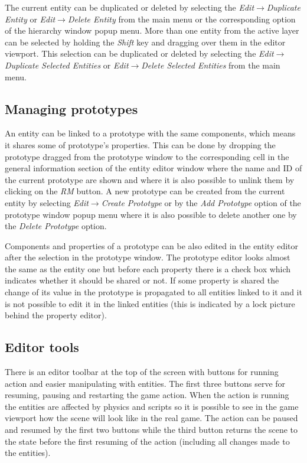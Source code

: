The current entity can be duplicated or deleted by selecting the \emph{Edit}$\rightarrow$\emph{Du\-pli\-ca\-te Entity} or \emph{Edit}$\rightarrow$\emph{Delete Entity} from the main menu or the corresponding option of the hierarchy window popup menu. More than one entity from the active layer can be selected by holding the \emph{Shift} key and dragging over them in the editor viewport. This selection can be duplicated or deleted by selecting the \emph{Edit}$\rightarrow$\emph{Duplicate Selected Entities} or \emph{Edit}$\rightarrow$\emph{Delete Selected Entities} from the main menu.

\subsection{Managing prototypes}
\label{sub:editor-prototypes}

An entity can be linked to a prototype with the same components, which means it shares some of prototype's properties. This can be done by dropping the prototype dragged from the prototype window to the corresponding cell in the general information section of the entity editor window where the name and ID of the current prototype are shown and where it is also possible to unlink them by clicking on the \emph{RM} button. A new prototype can be created from the current entity by selecting \emph{Edit}$\rightarrow$\emph{Create Prototype} or by the \emph{Add Prototype} option of the prototype window popup menu where it is also possible to delete another one by the \emph{Delete Prototype} option.

Components and properties of a prototype can be also edited in the entity editor after the selection in the prototype window. The prototype editor looks almost the same as the entity one but before each property there is a check box which indicates whether it should be shared or not. If some property is shared the change of its value in the prototype is propagated to all entities linked to it and it is not possible to edit it in the linked entities (this is indicated by a lock picture behind the property editor).

\subsection{Editor tools}
\label{sub:editor-tools}

There is an editor toolbar at the top of the screen with buttons for running action and easier manipulating with entities. The first three buttons serve for resuming, pausing and restarting the game action. When the action is running the entities are affected by physics and scripts so it is possible to see in the game viewport how the scene will look like in the real game. The action can be paused and resumed by the first two buttons while the third button returns the scene to the state before the first resuming of the action (including all changes made to the entities).

